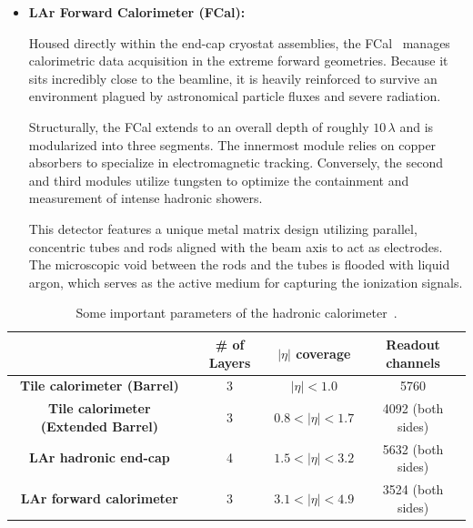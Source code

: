 \begin{itemize}
\item \textbf{LAr Forward Calorimeter (FCal):}

Housed directly within the end-cap cryostat assemblies, the FCal~\cite{ATLAS-TDR-04} manages calorimetric data acquisition in the extreme forward geometries. Because it sits incredibly close to the beamline, it is heavily reinforced to survive an environment plagued by astronomical particle fluxes and severe radiation.

Structurally, the FCal extends to an overall depth of roughly $10\,\lambda$ and is modularized into three segments. The innermost module relies on copper absorbers to specialize in electromagnetic tracking. Conversely, the second and third modules utilize tungsten to optimize the containment and measurement of intense hadronic showers.

This detector features a unique metal matrix design utilizing parallel, concentric tubes and rods aligned with the beam axis to act as electrodes. The microscopic void between the rods and the tubes is flooded with liquid argon, which serves as the active medium for capturing the ionization signals.

\end{itemize}


\begin{table}[!htbp]
    \small
    \centering
    \begin{tabular}{c|c|c|c}
        \hline\hline
         & \textbf{\# of Layers} & \textbf{$|\eta|$ coverage} & \textbf{Readout channels} \\
        \hline
        \textbf{Tile calorimeter (Barrel)} & 3 & $|\eta|<1.0$ & 5760 \\
        \textbf{Tile calorimeter (Extended Barrel)} & 3 & $0.8<|\eta|<1.7$ & 4092 (both sides) \\
        \textbf{LAr hadronic end-cap} & 4 & $1.5<|\eta|<3.2$ & 5632 (both sides) \\
        \textbf{LAr forward calorimeter} & 3 & $3.1<|\eta|<4.9$ & 3524 (both sides) \\
        \hline\hline
    \end{tabular}
    \caption{Some important parameters of the hadronic calorimeter~\cite{ATLAS-TDR-05}.}
    \label{tab:HadCal_parameters}
\end{table}


